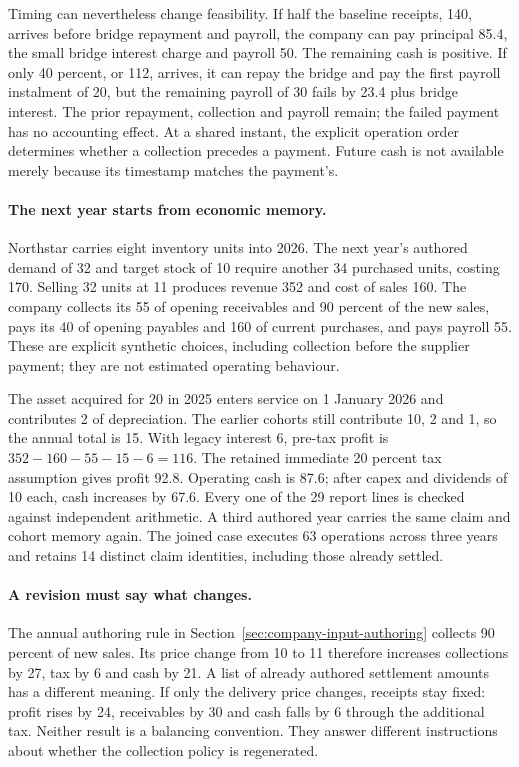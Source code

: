 Timing can nevertheless change feasibility. If half the baseline receipts,
140, arrives before bridge repayment and payroll, the company can pay principal
85.4, the small bridge interest charge and payroll 50. The remaining cash is
positive. If only 40 percent, or 112, arrives, it can repay the bridge and pay
the first payroll instalment of 20, but the remaining payroll of 30 fails by
23.4 plus bridge interest. The prior repayment, collection and payroll remain;
the failed payment has no accounting effect. At a shared instant, the explicit
operation order determines whether a collection precedes a payment. Future
cash is not available merely because its timestamp matches the payment's.

\paragraph{The next year starts from economic memory.}
Northstar carries eight inventory units into 2026. The next year's authored
demand of 32 and target stock of 10 require another 34 purchased units, costing
170. Selling 32 units at 11 produces revenue 352 and cost of sales 160. The
company collects its 55 of opening receivables and 90 percent of the new sales,
pays its 40 of opening payables and 160 of current purchases, and pays payroll
55. These are explicit synthetic choices, including collection before the
supplier payment; they are not estimated operating behaviour.

The asset acquired for 20 in 2025 enters service on 1 January 2026 and contributes
2 of depreciation. The earlier cohorts still contribute 10, 2 and 1, so the
annual total is 15. With legacy interest 6, pre-tax profit is
\(352-160-55-15-6=116\). The retained immediate 20 percent tax assumption
gives profit 92.8. Operating cash is 87.6; after capex and dividends of 10 each,
cash increases by 67.6. Every one of the 29 report lines is checked against
independent arithmetic. A third authored year carries the same claim and
cohort memory again. The joined case executes 63 operations across three years
and retains 14 distinct claim identities, including those already settled.

\paragraph{A revision must say what changes.}
The annual authoring rule in Section~\ref{sec:company-input-authoring} collects
90 percent of new sales. Its price change from 10 to 11 therefore increases
collections by 27, tax by 6 and cash by 21. A list of already authored settlement
amounts has a different meaning. If only the delivery price changes, receipts
stay fixed: profit rises by 24, receivables by 30 and cash falls by 6 through
the additional tax. Neither result is a balancing convention. They answer
different instructions about whether the collection policy is regenerated.

